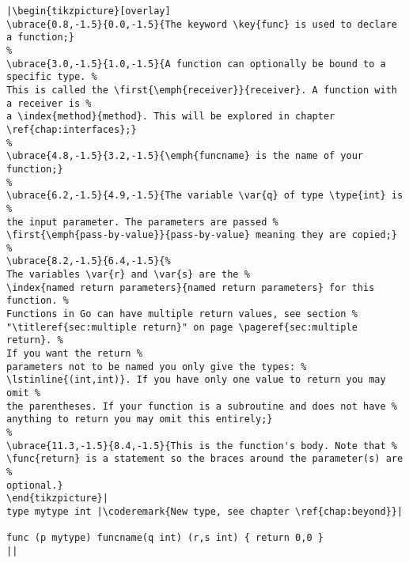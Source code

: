 \begin{lstlisting}[caption=A function declaration,label=src:function definition]
|\begin{tikzpicture}[overlay]
\ubrace{0.8,-1.5}{0.0,-1.5}{The keyword \key{func} is used to declare a function;}
%
\ubrace{3.0,-1.5}{1.0,-1.5}{A function can optionally be bound to a specific type. %
This is called the \first{\emph{receiver}}{receiver}. A function with a receiver is %
a \index{method}{method}. This will be explored in chapter \ref{chap:interfaces};}
%
\ubrace{4.8,-1.5}{3.2,-1.5}{\emph{funcname} is the name of your function;}
%
\ubrace{6.2,-1.5}{4.9,-1.5}{The variable \var{q} of type \type{int} is %
the input parameter. The parameters are passed %
\first{\emph{pass-by-value}}{pass-by-value} meaning they are copied;}
%
\ubrace{8.2,-1.5}{6.4,-1.5}{%
The variables \var{r} and \var{s} are the %
\index{named return parameters}{named return parameters} for this function. %
Functions in Go can have multiple return values, see section %
"\titleref{sec:multiple return}" on page \pageref{sec:multiple return}. %
If you want the return %
parameters not to be named you only give the types: %
\lstinline{(int,int)}. If you have only one value to return you may omit %
the parentheses. If your function is a subroutine and does not have %
anything to return you may omit this entirely;}
%
\ubrace{11.3,-1.5}{8.4,-1.5}{This is the function's body. Note that %
\func{return} is a statement so the braces around the parameter(s) are %
optional.}
\end{tikzpicture}|
type mytype int	|\coderemark{New type, see chapter \ref{chap:beyond}}|

func (p mytype) funcname(q int) (r,s int) { return 0,0 }
||
\end{lstlisting}
